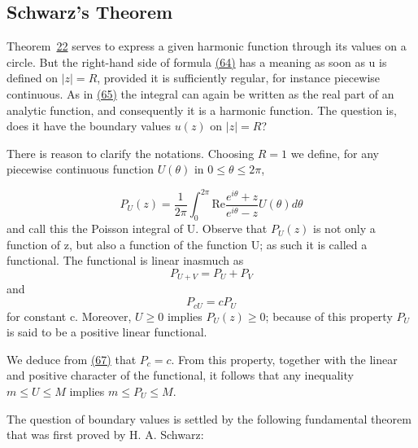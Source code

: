\setcounter{section}{6}\setcounter{subsection}{3}\subsection{Schwarz's Theorem}\label{sec:4.6.4}
Theorem~\hyperref[thm:4.22]{22} serves to express a given harmonic function through its values on a circle. But the right-hand side of formula \hyperref[eq:4.64]{(64)} has a meaning as soon as u is defined on $|z| = R$, provided it is sufficiently regular, for instance piecewise continuous. As in \hyperref[eq:4.65]{(65)} the integral can again be written as the real part of an analytic function, and consequently it is a harmonic function. The question is, does it have the boundary values $u(z)$ on $|z| = R$?

There is reason to clarify the notations. Choosing $R = 1$ we define, for any piecewise continuous function $U(\theta)$ in $0 \leq \theta \leq 2\pi$,


\begin{equation*}
P _ {U} (z) = \frac {1}{2 \pi} \int_ {0} ^ {2 \pi} \mathrm{Re} \frac {e ^ {i \theta} + z}{e ^ {i \theta} - z} U (\theta) d \theta
\end{equation*}
and call this the Poisson integral of U. Observe that $P_{U}(z)$ is not only a function of z, but also a function of the function U; as such it is called a functional. The functional is linear inasmuch as
\begin{equation*}
P _ {U + V} = P _ {U} + P _ {V}
\end{equation*}
and
\begin{equation*}
P _ {c U} = c P _ {U}
\end{equation*}
for constant c. Moreover, $U \geq 0$ implies $P_{U}(z) \geq 0$; because of this property $P_{U}$ is said to be a positive linear functional.

We deduce from \hyperref[eq:4.67]{(67)} that $P_{c} = c$. From this property, together with the linear and positive character of the functional, it follows that any inequality $m \leq U \leq M$ implies $m \leq P_{U} \leq M$.

The question of boundary values is settled by the following fundamental theorem that was first proved by H. A. Schwarz:

